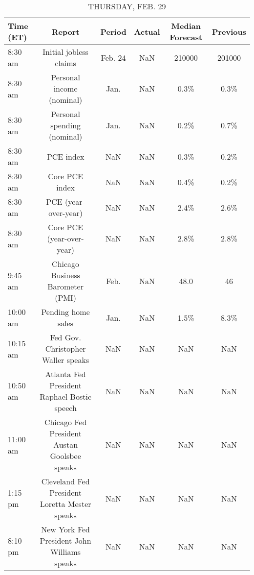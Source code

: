 \documentclass{article}%
\begin{document}
\begin{table}[htbp]%
\caption{THURSDAY, FEB. 29}%
\centering%
\begin{adjustbox}{width=1\textwidth}%
\begin{tabular}{lccccc}
\toprule
Time (ET) &                                        Report &  Period & Actual & Median Forecast & Previous \\
\midrule
  8:30 am &                        Initial jobless claims & Feb. 24 &    NaN &          210000 &   201000 \\
  8:30 am &                     Personal income (nominal) &    Jan. &    NaN &            0.3\% &     0.3\% \\
  8:30 am &                   Personal spending (nominal) &    Jan. &    NaN &            0.2\% &     0.7\% \\
  8:30 am &                                     PCE index &     NaN &    NaN &            0.3\% &     0.2\% \\
  8:30 am &                                Core PCE index &     NaN &    NaN &            0.4\% &     0.2\% \\
  8:30 am &                          PCE (year-over-year) &     NaN &    NaN &            2.4\% &     2.6\% \\
  8:30 am &                     Core PCE (year-over-year) &     NaN &    NaN &            2.8\% &     2.8\% \\
  9:45 am &              Chicago Business Barometer (PMI) &    Feb. &    NaN &            48.0 &       46 \\
 10:00 am &                            Pending home sales &    Jan. &    NaN &            1.5\% &     8.3\% \\
 10:15 am &            Fed Gov. Christopher Waller speaks &     NaN &    NaN &             NaN &      NaN \\
 10:50 am &   Atlanta Fed President Raphael Bostic speech &     NaN &    NaN &             NaN &      NaN \\
 11:00 am &  Chicago Fed President Austan Goolsbee speaks &     NaN &    NaN &             NaN &      NaN \\
  1:15 pm & Cleveland Fed President Loretta Mester speaks &     NaN &    NaN &             NaN &      NaN \\
  8:10 pm &   New York Fed President John Williams speaks &     NaN &    NaN &             NaN &      NaN \\
\bottomrule
\end{tabular}
%
\end{adjustbox}%
\end{table}
\end{document}
